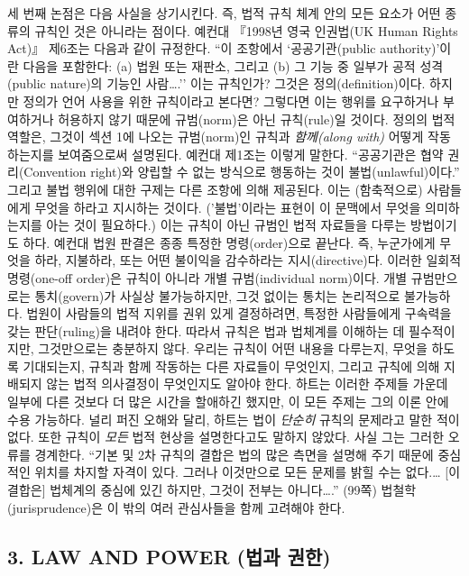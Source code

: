 \documentclass[12pt, oneside]{book}  %
\begin{document}
세 번째 논점은 다음 사실을 상기시킨다. 즉, 법적 규칙 체계 안의 모든
요소가 어떤 종류의 규칙인 것은 아니라는 점이다. 예컨대 『1998년 영국
인권법(UK Human Rights Act)』 제6조는 다음과 같이 규정한다. ``이
조항에서 `공공기관(public authority)'이란 다음을 포함한다: (a) 법원 또는
재판소, 그리고 (b) 그 기능 중 일부가 공적 성격(public nature)의 기능인
사람\ldots.'' 이는 규칙인가? 그것은 정의(definition)이다. 하지만 정의가
언어 사용을 위한 규칙이라고 본다면? 그렇다면 이는 행위를 요구하거나
부여하거나 허용하지 않기 때문에 규범(norm)은 아닌 규칙(rule)일 것이다.
정의의 법적 역할은, 그것이 섹션 1에 나오는 규범(norm)인 규칙과
\emph{함께(along with)} 어떻게 작동하는지를 보여줌으로써 설명된다.
예컨대 제1조는 이렇게 말한다. ``공공기관은 협약 권리(Convention right)와
양립할 수 없는 방식으로 행동하는 것이 불법(unlawful)이다.'' 그리고 불법
행위에 대한 구제는 다른 조항에 의해 제공된다. 이는 (함축적으로)
사람들에게 무엇을 하라고 지시하는 것이다. ('불법'이라는 표현이 이
문맥에서 무엇을 의미하는지를 아는 것이 필요하다.) 이는 규칙이 아닌
규범인 법적 자료들을 다루는 방법이기도 하다. 예컨대 법원 판결은 종종
특정한 명령(order)으로 끝난다. 즉, 누군가에게 무엇을 하라, 지불하라,
또는 어떤 불이익을 감수하라는 지시(directive)다. 이러한 일회적
명령(one-off order)은 규칙이 아니라 개별 규범(individual norm)이다. 개별
규범만으로는 통치(govern)가 사실상 불가능하지만, 그것 없이는 통치는
논리적으로 불가능하다. 법원이 사람들의 법적 지위를 권위 있게 결정하려면,
특정한 사람들에게 구속력을 갖는 판단(ruling)을 내려야 한다. 따라서
규칙은 법과 법체계를 이해하는 데 필수적이지만, 그것만으로는 충분하지
않다. 우리는 규칙이 어떤 내용을 다루는지, 무엇을 하도록 기대되는지,
규칙과 함께 작동하는 다른 자료들이 무엇인지, 그리고 규칙에 의해 지배되지
않는 법적 의사결정이 무엇인지도 알아야 한다. 하트는 이러한 주제들 가운데
일부에 다른 것보다 더 많은 시간을 할애하긴 했지만, 이 모든 주제는 그의
이론 안에 수용 가능하다. 널리 퍼진 오해와 달리, 하트는 법이
\emph{단순히} 규칙의 문제라고 말한 적이 없다. 또한 규칙이 \emph{모든}
법적 현상을 설명한다고도 말하지 않았다. 사실 그는 그러한 오류를
경계한다. ``기본 및 2차 규칙의 결합은 법의 많은 측면을 설명해 주기
때문에 중심적인 위치를 차지할 자격이 있다. 그러나 이것만으로 모든 문제를
밝힐 수는 없다.\ldots{} {[}이 결합은{]} 법체계의 중심에 있긴 하지만,
그것이 전부는 아니다\ldots.'' (99쪽) 법철학(jurisprudence)은 이 밖의
여러 관심사들을 함께 고려해야 한다.

\subsection{\texorpdfstring{\textbf{3. LAW AND POWER (법과
권한)}}{3. LAW AND POWER (법과 권한)}}\label{law-and-power-uxbc95uxacfc-uxad8cuxd55c}
\end{document}
